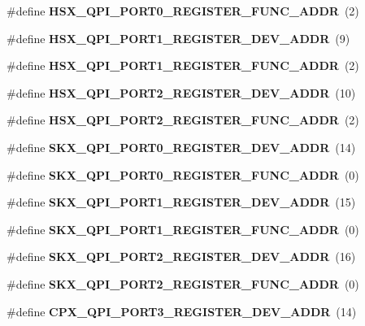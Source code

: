 \begin{DoxyCompactItemize}
\#define {\bfseries H\+S\+X\+\_\+\+Q\+P\+I\+\_\+\+P\+O\+R\+T0\+\_\+\+R\+E\+G\+I\+S\+T\+E\+R\+\_\+\+F\+U\+N\+C\+\_\+\+A\+D\+DR}~(2)
\item 
\mbox{\label{types_8h_a64985442a941e4070f0585672d0a3340}} 
\#define {\bfseries H\+S\+X\+\_\+\+Q\+P\+I\+\_\+\+P\+O\+R\+T1\+\_\+\+R\+E\+G\+I\+S\+T\+E\+R\+\_\+\+D\+E\+V\+\_\+\+A\+D\+DR}~(9)
\item 
\mbox{\label{types_8h_a257dd878e1ccdf0c108ad13133d64543}} 
\#define {\bfseries H\+S\+X\+\_\+\+Q\+P\+I\+\_\+\+P\+O\+R\+T1\+\_\+\+R\+E\+G\+I\+S\+T\+E\+R\+\_\+\+F\+U\+N\+C\+\_\+\+A\+D\+DR}~(2)
\item 
\mbox{\label{types_8h_aba140794faf97a7b88354effb66d83e0}} 
\#define {\bfseries H\+S\+X\+\_\+\+Q\+P\+I\+\_\+\+P\+O\+R\+T2\+\_\+\+R\+E\+G\+I\+S\+T\+E\+R\+\_\+\+D\+E\+V\+\_\+\+A\+D\+DR}~(10)
\item 
\mbox{\label{types_8h_a5af4ebca9c3867cda66035a6bcdcb548}} 
\#define {\bfseries H\+S\+X\+\_\+\+Q\+P\+I\+\_\+\+P\+O\+R\+T2\+\_\+\+R\+E\+G\+I\+S\+T\+E\+R\+\_\+\+F\+U\+N\+C\+\_\+\+A\+D\+DR}~(2)
\item 
\mbox{\label{types_8h_a38c5fc70706417e1b3a6731d857e2bcf}} 
\#define {\bfseries S\+K\+X\+\_\+\+Q\+P\+I\+\_\+\+P\+O\+R\+T0\+\_\+\+R\+E\+G\+I\+S\+T\+E\+R\+\_\+\+D\+E\+V\+\_\+\+A\+D\+DR}~(14)
\item 
\mbox{\label{types_8h_a24c7bd95ef42a115991293a54edc906c}} 
\#define {\bfseries S\+K\+X\+\_\+\+Q\+P\+I\+\_\+\+P\+O\+R\+T0\+\_\+\+R\+E\+G\+I\+S\+T\+E\+R\+\_\+\+F\+U\+N\+C\+\_\+\+A\+D\+DR}~(0)
\item 
\mbox{\label{types_8h_a129d79cf486ab194df242f309d7bfa86}} 
\#define {\bfseries S\+K\+X\+\_\+\+Q\+P\+I\+\_\+\+P\+O\+R\+T1\+\_\+\+R\+E\+G\+I\+S\+T\+E\+R\+\_\+\+D\+E\+V\+\_\+\+A\+D\+DR}~(15)
\item 
\mbox{\label{types_8h_af774cd0630f68a57567c6083e77a71ad}} 
\#define {\bfseries S\+K\+X\+\_\+\+Q\+P\+I\+\_\+\+P\+O\+R\+T1\+\_\+\+R\+E\+G\+I\+S\+T\+E\+R\+\_\+\+F\+U\+N\+C\+\_\+\+A\+D\+DR}~(0)
\item 
\mbox{\label{types_8h_a6f28d001c7d9eb5b929b747faf96c573}} 
\#define {\bfseries S\+K\+X\+\_\+\+Q\+P\+I\+\_\+\+P\+O\+R\+T2\+\_\+\+R\+E\+G\+I\+S\+T\+E\+R\+\_\+\+D\+E\+V\+\_\+\+A\+D\+DR}~(16)
\item 
\mbox{\label{types_8h_ad87013f9d23bcaf7c56ea5e3e63d2908}} 
\#define {\bfseries S\+K\+X\+\_\+\+Q\+P\+I\+\_\+\+P\+O\+R\+T2\+\_\+\+R\+E\+G\+I\+S\+T\+E\+R\+\_\+\+F\+U\+N\+C\+\_\+\+A\+D\+DR}~(0)
\item 
\mbox{\label{types_8h_a13e1fa4de1f8f2616ecdeb821b6d3c3e}} 
\#define {\bfseries C\+P\+X\+\_\+\+Q\+P\+I\+\_\+\+P\+O\+R\+T3\+\_\+\+R\+E\+G\+I\+S\+T\+E\+R\+\_\+\+D\+E\+V\+\_\+\+A\+D\+DR}~(14)

\end{DoxyCompactItemize}
